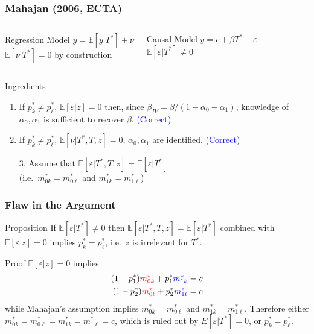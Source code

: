 \documentclass{beamer}
\begin{document}
\begin{frame}
  \frametitle{Mahajan (2006, ECTA)}
    \begin{columns}[c]
    \begin{exampleblock}{Regression Model}
      $y = \mathbb{E}[y|T^*] + \nu$\\
      {\small $\mathbb{E}[\nu|T^*]=0$ by construction}
    \end{exampleblock}
    \begin{exampleblock}{Causal Model}
     $y = c + \beta T^* + \varepsilon$\\
     {\small$\mathbb{E}[\varepsilon|T^*]\neq 0$}
    \end{exampleblock}
    \end{columns}

    \vspace{0.7em}

    \begin{block}{Ingredients}
      
  \begin{enumerate}
    \item If $p^*_k \neq p^*_\ell$, $\mathbb{E}[\varepsilon|z]=0$ then, since $\beta_{IV} = \beta/(1-\alpha_0-\alpha_1)$, knowledge of $\alpha_0,\alpha_1$ is sufficient to recover $\beta$. \textcolor{blue}{(Correct)}
    \item If $p^*_k \neq p^*_\ell$, $\mathbb{E}[\nu|T^*,T,z]=0$, $\alpha_0, \alpha_1$ are identified. \textcolor{blue}{(Correct)}
    \item[] \alert{}
    \item[3.] Assume that $\mathbb{E}[\varepsilon|T^*,T,z]=\mathbb{E}[\varepsilon|T^*]$ \\ {\small (i.e.\ $m_{0k}^* = m_{0\ell}^*$ and $m_{1k}^*=m_{1\ell}^*$)}
  \end{enumerate}
    \end{block}
\end{frame}
\begin{frame}
  \frametitle{Flaw in the Argument}
  \begin{block}{Proposition}
    If $\mathbb{E}[\varepsilon|T^*]\neq 0$ then  $\mathbb{E}[\varepsilon|T^*,T,z]=\mathbb{E}[\varepsilon|T^*]$ combined with $\mathbb{E}[\varepsilon|z]=0$ implies $p^*_k = p^*_\ell$, i.e.\ $z$ is irrelevant for $T^*$.
  \end{block}
  \begin{block}{Proof}
    $\mathbb{E}[\varepsilon|z]=0$ implies
  \begin{align*}
    (1-p_1^*) \textcolor{red}{m^*_{0k}} + p^*_1 \textcolor{blue}{m^*_{1k}}&=c\\
    (1-p_2^*) \textcolor{red}{m^*_{0\ell}} + p^*_2 \textcolor{blue}{m^*_{1\ell}}&=c
  \end{align*}
  while Mahajan's assumption implies $m_{0k}^* = m_{0\ell}^*$ and $m_{1k}^*=m_{1\ell}^*$.
  Therefore either $m_{0k}^*=m_{0\ell}^* = m_{1k}^* =m_{1\ell}^*=c$, which is ruled out by $E[\varepsilon|T^*]=0$, or $p^*_k = p^*_\ell$.
  \end{block}
    \hyperlink{MAHAJAN_BODY}{}
\end{frame}
\end{document}
